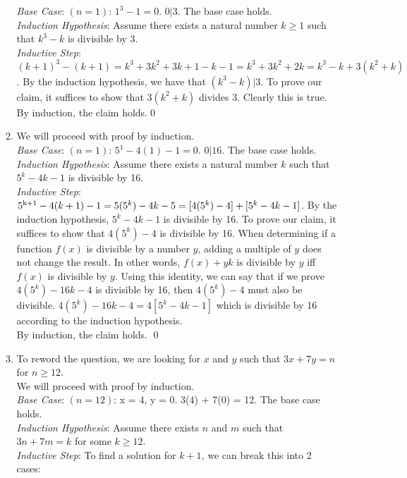 \documentclass[a4paper]{article}
\newcommand{\<}{\langle}
\renewcommand{\>}{\rangle}
\renewcommand{\^}{\wedge}
\begin{document}
\begin{enumerate}
\begin{enumerate}
            \textit{Base Case}: $(n = 1)$: $1^3 - 1 = 0$. $0 | 3$. The base case holds.\\
            \textit{Induction Hypothesis}: Assume there exists a natural number $k \geq 1$ such that $k^3 - k$ is divisible by 3.\\
            \textit{Inductive Step}: $(k+1)^3 - (k+1) = k^3 + 3k^2 + 3k + 1 - k - 1 = k^3 + 3k^2 + 2k = k^3 - k + 3(k^2 + k)$. By the induction hypothesis, we have that $(k^3 - k) | 3$. To prove our claim, it suffices to show that $3(k^2 + k)$ divides 3. Clearly this is true.\\
            By induction, the claim holds.\qed
            \item We will proceed with proof by induction.\\
            \textit{Base Case}: $(n = 1)$: $5^1 - 4(1) - 1 = 0$. $0 | 16$. The base case holds.\\
            \textit{Induction Hypothesis}: Assume there exists a natural number $k$ such that $5^k - 4k - 1$ is divisible by 16.\\
            \textit{Inductive Step}: $5\textsuperscript{k+1} - 4(k+1) - 1 = 5(5^k) - 4k - 5 = [4(5^k) - 4] + [5^k - 4k - 1]$. By the induction hypothesis, $5^k - 4k - 1$ is divisible by 16. To prove our claim, it suffices to show that $4(5^k) - 4$ is divisible by 16. When determining if a function $f(x)$ is divisible by a number $y$, adding a multiple of $y$ does not change the result. In other words, $f(x) + yk$ is divisible by $y$ iff $f(x)$ is divisible by $y$. Using this identity, we can say that if we prove $4(5^k) - 16k - 4$ is divisible by 16, then $4(5^k) -4$ must also be divisible. $4(5^k) - 16k - 4 = 4[5^k - 4k - 1]$ which is divisible by 16 according to the induction hypothesis.\\
            By induction, the claim holds. \qed
            \item To reword the question, we are looking for $x$ and $y$ such that $3x + 7y = n$ for $n \geq 12$.\\
            We will proceed with proof by induction.\\
            \textit{Base Case}: $(n=12)$: x = 4, y = 0. 3(4) + 7(0) = 12. The base case holds.\\
            \textit{Induction Hypothesis}: Assume there exists $n$ and $m$ such that $3n + 7m = k$ for some $k \geq 12$.\\
            \textit{Inductive Step}: To find a solution for $k+1$, we can break this into 2 cases:
            \begin{itemize}

\end{itemize}
\end{enumerate}
\end{enumerate}
\end{document}
